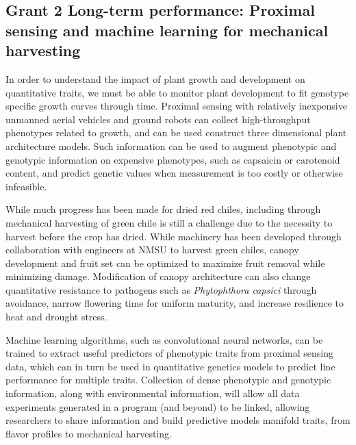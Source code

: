\documentclass[11pt]{article}
\begin{document}


\subsection*{Grant 2 Long-term performance: Proximal sensing and machine learning for mechanical harvesting}

In order to understand the impact of plant growth and development on quantitative traits, we must be able to monitor plant development to fit genotype specific growth curves through time. Proximal sensing with relatively inexpensive unmanned aerial vehicles and ground robots can collect high-throughput phenotypes related to growth, and can be used construct three dimensional plant architecture models. Such information can be used to augment phenotypic and genotypic information on expensive phenotypes, such as capsaicin or carotenoid content, and predict genetic values when measurement is too costly or otherwise infeasible.

While much progress has been made for dried red chiles, including through mechanical harvesting of green chile is still a challenge due to the necessity to harvest before the crop has dried. While machinery has been developed through collaboration with engineers at NMSU to harvest green chiles, canopy development and fruit set can be optimized to maximize fruit removal while minimizing damage. Modification of canopy architecture can also change quantitative resistance to pathogens such as \emph{Phytophthora capsici} through avoidance, narrow flowering time for uniform maturity, and increase resilience to heat and drought stress.

Machine learning algorithms, such as convolutional neural networks, can be trained to extract useful predictors of phenotypic traits from proximal sensing data, which can in turn be used in quantitative genetics models to predict line performance for multiple traits. Collection of dense phenotypic and genotypic information, along with environmental information, will allow all data experiments generated in a program (and beyond) to be linked, allowing researchers to share information and build predictive models manifold traits, from flavor profiles to mechanical harvesting.

\end{document}
